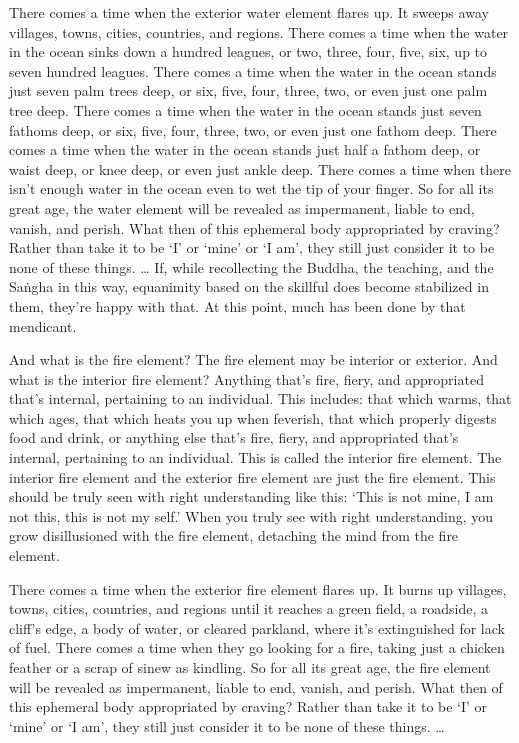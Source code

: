 \documentclass[12pt,openany]{book}%
\begin{document}
There comes a time when the exterior water element flares up. It sweeps away villages, towns, cities, countries, and regions. There comes a time when the water in the ocean sinks down a hundred leagues, or two, three, four, five, six, up to seven hundred leagues. There comes a time when the water in the ocean stands just seven palm trees deep, or six, five, four, three, two, or even just one palm tree deep. There comes a time when the water in the ocean stands just seven fathoms deep, or six, five, four, three, two, or even just one fathom deep. There comes a time when the water in the ocean stands just half a fathom deep, or waist deep, or knee deep, or even just ankle deep. There comes a time when there isn’t enough water in the ocean even to wet the tip of your finger. So for all its great age, the water element will be revealed as impermanent, liable to end, vanish, and perish. What then of this ephemeral body appropriated by craving? Rather than take it to be ‘I’ or ‘mine’ or ‘I am’, they still just consider it to be none of these things. … If, while recollecting the Buddha, the teaching, and the \textsanskrit{Saṅgha} in this way, equanimity based on the skillful does become stabilized in them, they’re happy with that. At this point, much has been done by that mendicant. 

And what is the fire element? The fire element may be interior or exterior. And what is the interior fire element? Anything that’s fire, fiery, and appropriated that’s internal, pertaining to an individual. This includes: that which warms, that which ages, that which heats you up when feverish, that which properly digests food and drink, or anything else that’s fire, fiery, and appropriated that’s internal, pertaining to an individual. This is called the interior fire element. The interior fire element and the exterior fire element are just the fire element. This should be truly seen with right understanding like this: ‘This is not mine, I am not this, this is not my self.’ When you truly see with right understanding, you grow disillusioned with the fire element, detaching the mind from the fire element. 

There comes a time when the exterior fire element flares up. It burns up villages, towns, cities, countries, and regions until it reaches a green field, a roadside, a cliff’s edge, a body of water, or cleared parkland, where it’s extinguished for lack of fuel. There comes a time when they go looking for a fire, taking just a chicken feather or a scrap of sinew as kindling. So for all its great age, the fire element will be revealed as impermanent, liable to end, vanish, and perish. What then of this ephemeral body appropriated by craving? Rather than take it to be ‘I’ or ‘mine’ or ‘I am’, they still just consider it to be none of these things. … 
\end{document}
